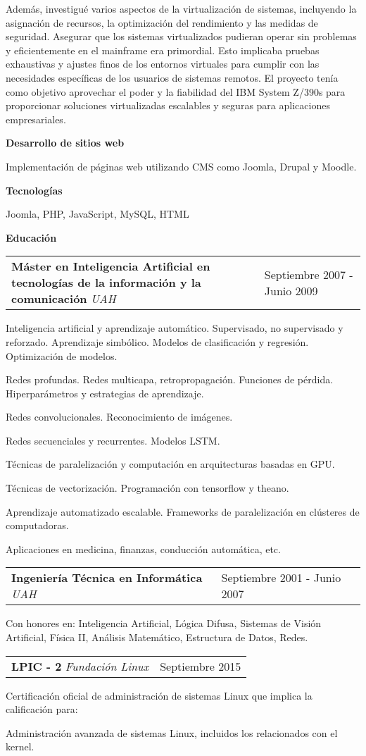 \documentclass[a4paper,10pt]{article}
\makeatletter
\newcommand{\cvsection}[1]{
  \vspace{2mm}
  \begin{tcolorbox}[colback=gray!30, colframe=gray!30, boxrule=0pt, arc=0mm, outer arc=0mm, width=\textwidth, boxsep=0pt, left=2mm, right=2mm]
    \raggedright\textbf{\LARGE{#1}}
  \end{tcolorbox}
  \vspace{2mm}
}
\newcommand{\cvsubsection}[3]{
  \begin{tcolorbox}[colback=gray!20, colframe=gray!20, boxrule=0pt, arc=0mm, outer arc=0mm, width=\dimexpr\textwidth-2mm\relax, boxsep=0pt, left=2mm, right=2mm, top=2mm, bottom=2mm]
    \begin{tabular*}{\dimexpr\textwidth-6mm\relax}{p{0.7\textwidth} @{\extracolsep{\fill}} p{0.3\textwidth}}
      \raggedright
      \textbf{#1} \textit{#2} & \raggedleft \small{#3}
    \end{tabular*}
  \end{tcolorbox}
  \vspace{2mm}
}
\newcommand{\cvsubsubsection}[1]{
\begin{tcolorbox}[colback=gray!10, colframe=gray!10, boxrule=0pt, arc=0mm, outer arc=0mm, width=\textwidth, boxsep=0pt, left=4mm, right=4mm, top=1mm, bottom=1mm]
  \textbf{#1}
\end{tcolorbox}
\vspace{1mm}
}
\newcommand{\cvsubsubsubsection}[1]{
  \begin{tcolorbox}[colback=gray!5, colframe=gray!5, boxrule=0pt, arc=0mm, outer arc=0mm, width=\textwidth, boxsep=0pt, left=6mm, right=6mm, top=1mm, bottom=1mm]
    \textbf{#1}
  \end{tcolorbox}
  \vspace{1mm}
}
\makeatother
\begin{document}
Además, investigué varios aspectos de la virtualización de sistemas, incluyendo la asignación de recursos, la optimización del rendimiento y las medidas de seguridad. Asegurar que los sistemas virtualizados pudieran operar sin problemas y eficientemente en el mainframe era primordial. Esto implicaba pruebas exhaustivas y ajustes finos de los entornos virtuales para cumplir con las necesidades específicas de los usuarios de sistemas remotos. El proyecto tenía como objetivo aprovechar el poder y la fiabilidad del IBM System Z/390s para proporcionar soluciones virtualizadas escalables y seguras para aplicaciones empresariales.

\cvsubsubsection{Desarrollo de sitios web}
Implementación de páginas web utilizando CMS como Joomla, Drupal y Moodle.

\cvsubsubsubsection{Tecnologías}
Joomla, PHP, JavaScript, MySQL, HTML

\cvsection{Educación}
\cvsubsection{Máster en Inteligencia Artificial en tecnologías de la información y la comunicación}{UAH}{Septiembre 2007 - Junio 2009}
Inteligencia artificial y aprendizaje automático. Supervisado, no supervisado y reforzado. Aprendizaje simbólico. Modelos de clasificación y regresión. Optimización de modelos.

Redes profundas. Redes multicapa, retropropagación. Funciones de pérdida. Hiperparámetros y estrategias de aprendizaje.

Redes convolucionales. Reconocimiento de imágenes.

Redes secuenciales y recurrentes. Modelos LSTM.

Técnicas de paralelización y computación en arquitecturas basadas en GPU.

Técnicas de vectorización. Programación con tensorflow y theano.

Aprendizaje automatizado escalable. Frameworks de paralelización en clústeres de computadoras.

Aplicaciones en medicina, finanzas, conducción automática, etc.

\cvsubsection{Ingeniería Técnica en Informática}{UAH}{Septiembre 2001 - Junio 2007}
Con honores en: Inteligencia Artificial, Lógica Difusa, Sistemas de Visión Artificial, Física II, Análisis Matemático, Estructura de Datos, Redes.

\cvsubsection{LPIC - 2}{Fundación Linux}{Septiembre 2015}
Certificación oficial de administración de sistemas Linux que implica la calificación para:

Administración avanzada de sistemas Linux, incluidos los relacionados con el kernel.
\end{document}
